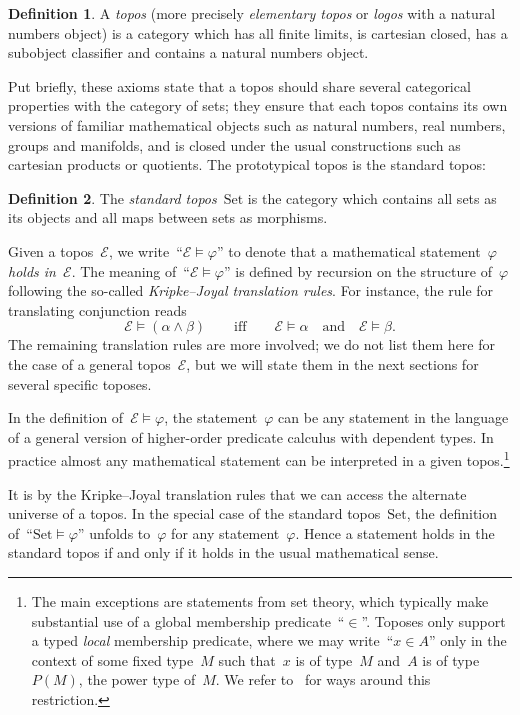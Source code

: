 \documentclass[oneside,reqno]{amsart}
\theoremstyle{definition}
\newtheorem{defn}{Definition}[section]
\theoremstyle{plain}
\theoremstyle{remark}
\newcommand{\E}{\mathcal{E}}
\newcommand{\Set}{\mathrm{Set}}
\renewcommand{\_}{\mathpunct{.}\,}
\newcommand{\?}{\,{:}\,}
\begin{document}
\begin{defn}A \emph{topos} (more precisely \emph{elementary topos} or
\emph{logos} with a natural numbers object) is a category which has all finite
limits, is cartesian closed, has a subobject classifier and contains a natural
numbers object.\end{defn}

Put briefly, these axioms state that a topos should share several categorical
properties with the category of sets; they ensure that each topos contains its
own versions of familiar mathematical objects such as natural numbers, real
numbers, groups and manifolds, and is closed under the usual constructions
such as cartesian products or quotients.
The prototypical topos is the standard topos:

\begin{defn}The \emph{standard topos}~$\Set$ is the category which contains all
sets as its objects and all maps between sets as morphisms.\end{defn}

Given a topos~$\E$, we write~``$\E \models \varphi$'' to denote that a
mathematical statement~$\varphi$ \emph{holds in~$\E$}. The meaning of~``$\E \models
\varphi$'' is defined by recursion on the structure of~$\varphi$ following the
so-called \emph{Kripke--Joyal translation rules}. For instance, the rule for
translating conjunction reads
\[ \E \models (\alpha \wedge \beta) \qquad\text{iff}\qquad
  \E \models \alpha \quad\text{and}\quad \E \models \beta. \]
The remaining translation rules are more involved; we do not list them here for
the case of a general topos~$\E$, but we will state them in the next sections
for several specific toposes.

In the definition of~$\E \models \varphi$, the statement~$\varphi$ can be any
statement in the language of a general version of higher-order predicate
calculus with dependent types. In practice almost any mathematical statement
can be interpreted in a given topos.\footnote{The main exceptions are
statements from set theory, which typically make substantial use of a global
membership predicate~``$\in$''. Toposes only support a typed \emph{local}
membership predicate, where we may write~``$x \in A$'' only in the context of
some fixed type~$M$ such that~$x$ is of type~$M$ and~$A$ is of
type~$P(M)$, the power type of~$M$. We refer to~\cite{XXX} for ways around this
restriction.}

It is by the Kripke--Joyal translation rules that we can access the alternate
universe of a topos. In the special case of the standard topos~$\Set$, the
definition of~``$\Set \models \varphi$'' unfolds to~$\varphi$ for any
statement~$\varphi$. Hence a statement holds in the standard topos if and only
if it holds in the usual mathematical sense.
\end{document}
